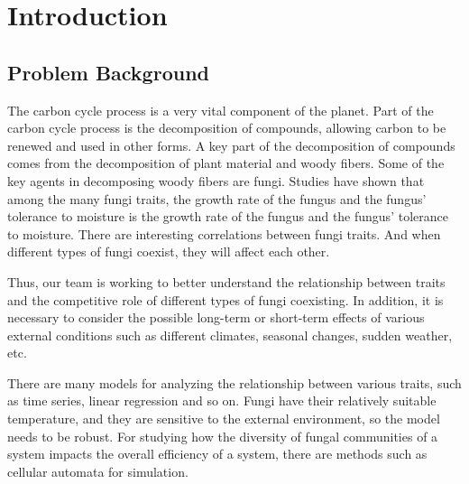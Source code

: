 \documentclass{mcmthesis}
\begin{document}


\section{Introduction}
\subsection{Problem Background}

The carbon cycle process is a very vital component of the planet. Part of the carbon cycle process is the decomposition of compounds, allowing carbon to be renewed and used in other forms. A key part of the decomposition of compounds comes from the decomposition of plant material and woody fibers. Some of the key agents in decomposing woody fibers are fungi. Studies have shown that among the many fungi traits, the growth rate of the fungus and the fungus' tolerance to moisture is the growth rate of the fungus and the fungus' tolerance to moisture. There are interesting correlations between fungi traits. And when different types of fungi coexist, they will affect each other. 


Thus, our team is working to better understand the relationship between traits and the competitive role of different types of fungi coexisting. In addition, it is necessary to consider the possible long-term or short-term effects of various external conditions such as different climates, seasonal changes, sudden weather, etc. 

There are many models for analyzing the relationship between various traits, such as time series, linear regression and so on. Fungi have their relatively suitable temperature, and they are sensitive to the external environment, so the model needs to be robust. For studying how the diversity of fungal communities of a system impacts the overall efficiency of a system, there are methods such as cellular automata for simulation. 
\end{document}

